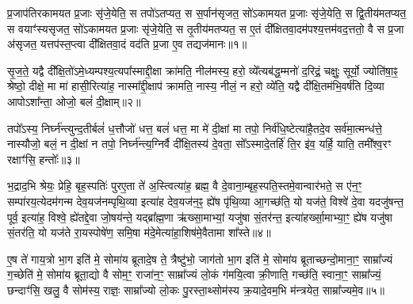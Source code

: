 {}

\setcounter{anuvakam}{0}
प्र॒जाप॑तिरकामयत प्र॒जाः सृ॑जे॒येति॒ स तपो॑\-ऽतप्यत॒ स स॒र्पान॑सृजत॒ सो॑\-ऽकामयत प्र॒जाः सृ॑जे॒येति॒ स द्वि॒तीय॑म\-तप्यत॒ स वयाꣳ॑स्यसृजत॒ सो॑\-ऽकामयत प्र॒जाः सृ॑जे॒येति॒ स तृ॒तीय॑मतप्यत॒ स ए॒तं दी᳚क्षितवा॒दम॑पश्य॒त्तम॑वद॒त्ततो॒ वै स प्र॒जा अ॑सृजत॒ यत्तप॑स्त॒प्त्वा दी᳚क्षितवा॒दं वद॑ति प्र॒जा ए॒व तद्यज॑मानः॥१॥

सृ॒ज॒ते॒ यद्वै दी᳚क्षि॒तो॑\-ऽमे॒ध्यम्पश्य॒त्यपा᳚स्माद्दी॒क्षा क्रा॑मति॒ नील॑मस्य॒ हरो॒ व्ये᳚त्यब॑द्ध॒म्मनो॑ द॒रिद्रं॒ चक्षुः॒ सूर्यो॒ ज्योति॑षा॒ꣴ॒ श्रेष्ठो॒ दीक्षे॒ मा मा॑ हासी॒रित्या॑ह॒ नास्मा᳚द्दी॒क्षाप॑ क्रामति॒ नास्य॒ नीलं॒ न हरो॒ व्ये॑ति॒ यद्वै दी᳚क्षि॒तम॑भि॒वर्\mbox{}ष॑ति दि॒व्या आपो\-ऽशा᳚न्ता॒ ओजो॒ बलं॑ दी॒क्षाम्॥२॥

तपो᳚\-ऽस्य॒ निर्घ्न॑न्त्युन्द॒तीर्बलं॑ ध॒त्तौजो॑ धत्त॒ बलं॑ धत्त॒ मा मे॑ दी॒क्षां मा तपो॒ निर्व॑धि॒ष्टेत्या॑है॒तदे॒व सर्व॑मा॒त्मन्ध॑त्ते॒ नास्यौजो॒ बलं॒ न दी॒क्षां न तपो॒ निर्घ्न॑न्त्य॒ग्निर्वै दी᳚क्षि॒तस्य॑ दे॒वता॒ सो᳚\-ऽस्मादे॒तर्\mbox{}हि॑ ति॒र इ॑व॒ यर्\mbox{}हि॒ याति॒ तमी᳚श्व॒रꣳ रक्षाꣳ॑सि॒ हन्तोः᳚॥३॥

भ॒द्राद॒भि श्रेयः॒ प्रेहि॒ बृह॒स्पतिः॑ पुरए॒ता ते॑ अ॒स्त्वित्या॑ह॒ ब्रह्म॒ वै दे॒वाना॒म्बृह॒स्पति॒स्तमे॒वान्वार॑भते॒ स ए॑न॒ꣳ॒ सम्पा॑रय॒त्येदम॑गन्म देव॒यज॑नम्पृथि॒व्या इत्या॑ह देव॒यज॑न॒ꣴ॒ ह्ये॑ष पृ॑थि॒व्या आ॒गच्छ॑ति॒ यो यज॑ते॒ विश्वे॑ दे॒वा यदजु॑षन्त॒ पूर्व॒ इत्या॑ह॒ विश्वे॒ ह्ये॑तद्दे॒वा जो॒षय॑न्ते॒ यद्ब्रा᳚ह्म॒णा ऋ॑ख्सा॒माभ्यां॒ यजु॑षा सं॒तर॑न्त॒ इत्या॑हर्ख्सा॒माभ्या॒ꣳ॒ ह्ये॑ष यजु॑षा सं॒तर॑ति॒ यो यज॑ते रा॒यस्पोषे॑ण॒ समि॒षा म॑दे॒मेत्या॑हा॒शिष॑मे॒वैतामा शा᳚स्ते॥४॥

{\anuvakamend[{यज॑मानो दी॒क्षाꣳ हन्तो᳚र्ब्राह्म॒णाश्चतु॑र्विꣳशतिश्च॥१॥}]}

ए॒ष ते॑ गाय॒त्रो भा॒ग इति॑ मे॒ सोमा॑य ब्रूतादे॒ष ते॒ त्रैष्टु॑भो॒ जाग॑तो भा॒ग इति॑ मे॒ सोमा॑य ब्रूताच्छन्दो॒माना॒ꣳ॒ साम्रा᳚ज्यं ग॒च्छेति॑ मे॒ सोमा॑य ब्रूता॒द्यो वै सोम॒ꣳ॒ राजा॑न॒ꣳ॒ साम्रा᳚ज्यं लो॒कं ग॑मयि॒त्वा क्री॒णाति॒ गच्छ॑ति॒ स्वाना॒ꣳ॒ साम्रा᳚ज्यं॒ छन्दाꣳ॑सि॒ खलु॒ वै सोम॑स्य॒ राज्ञः॒ साम्रा᳚ज्यो लो॒कः पु॒रस्ता॒थ्सोम॑स्य क्र॒यादे॒वम॒भि म॑न्त्रयेत॒ साम्रा᳚ज्यमे॒व॥५॥

